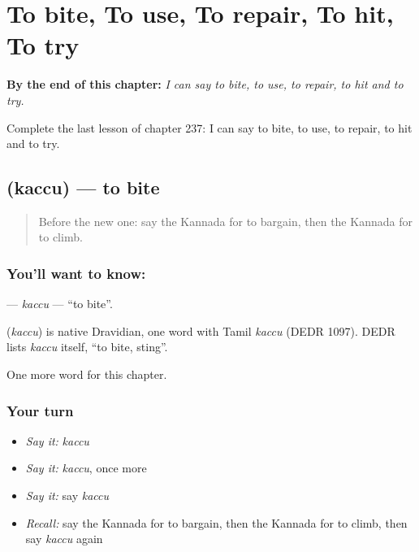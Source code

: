 
\chapter{To bite, To use, To repair, To hit, To try}
\label{ch:ka-to-bite-to-use-to-repair-to-hit-to-try}

\begin{chapteropening}
\textbf{By the end of this chapter:} \emph{I can say to bite, to use, to repair, to hit and to try.}

Complete the last lesson of chapter 237: I can say to bite, to use, to repair, to hit and to try.
\end{chapteropening}

\section[\texorpdfstring{\kn{ಕಚ್ಚು} (kaccu)}{ಕಚ್ಚು (kaccu)}]{ (kaccu) — to bite}

\label{lesson:KA-C237-kaccu}



\begin{quote}
Before the new one: say the Kannada for to bargain, then the Kannada for to climb.
\end{quote}

\subsection*{You'll want to know: }
\textbf{} — \emph{kaccu} — \textquotedblleft{}to bite\textquotedblright{}.

\begin{cousinweb}
\textbf{} (\emph{kaccu}) is native Dravidian, one word with Tamil \emph{kaccu} (DEDR 1097). DEDR lists \emph{kaccu} itself, \textquotedblleft{}to bite, sting\textquotedblright{}.
\end{cousinweb}

\begin{grammarlens}[title={What you've built}]
One more word for this chapter.
\end{grammarlens}

\subsection*{Your turn}
\begin{itemize}
\raggedright
  \item \emph{Say it:} \emph{kaccu}
  \item \emph{Say it:} \emph{kaccu}, once more
  \item \emph{Say it:} say \emph{kaccu}
  \item \emph{Recall:} say the Kannada for to bargain, then the Kannada for to climb, then say \emph{kaccu} again
\end{itemize}

